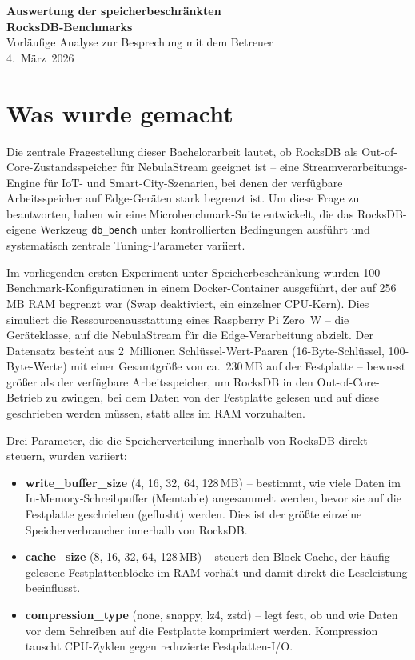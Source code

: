 \documentclass[11pt,a4paper]{scrartcl}
\begin{document}
\begin{center}
  {\LARGE\bfseries Auswertung der speicherbeschränkten\\RocksDB-Benchmarks}\\[6pt]
  {\large Vorläufige Analyse zur Besprechung mit dem Betreuer}\\[4pt]
  {\normalsize 4.~März~2026}
\end{center}

\bigskip

\section{Was wurde gemacht}

Die zentrale Fragestellung dieser Bachelorarbeit lautet, ob RocksDB als
Out-of-Core-Zustandsspeicher für NebulaStream geeignet ist -- eine
Streamverarbeitungs-Engine für IoT- und Smart-City-Szenarien, bei denen der
verfügbare Arbeitsspeicher auf Edge-Geräten stark begrenzt ist. Um diese Frage
zu beantworten, haben wir eine Microbenchmark-Suite entwickelt, die das
RocksDB-eigene Werkzeug \texttt{db\_bench} unter kontrollierten Bedingungen
ausführt und systematisch zentrale Tuning-Parameter variiert.

Im vorliegenden ersten Experiment unter Speicherbeschränkung wurden 100
Benchmark-Konfigurationen in einem Docker-Container ausgeführt, der auf
256\,MB RAM begrenzt war (Swap deaktiviert, ein einzelner CPU-Kern). Dies
simuliert die Ressourcenausstattung eines Raspberry Pi Zero~W -- die
Geräteklasse, auf die NebulaStream für die Edge-Verarbeitung abzielt. Der
Datensatz besteht aus 2~Millionen Schlüssel-Wert-Paaren (16-Byte-Schlüssel,
100-Byte-Werte) mit einer Gesamtgröße von ca.\ 230\,MB auf der Festplatte
-- bewusst größer als der verfügbare Arbeitsspeicher, um RocksDB in den
Out-of-Core-Betrieb zu zwingen, bei dem Daten von der Festplatte gelesen und
auf diese geschrieben werden müssen, statt alles im RAM vorzuhalten.

Drei Parameter, die die Speicherverteilung innerhalb von RocksDB direkt
steuern, wurden variiert:

\begin{itemize}
  \item \textbf{write\_buffer\_size} (4, 16, 32, 64, 128\,MB) -- bestimmt, wie
        viele Daten im In-Memory-Schreibpuffer (Memtable) angesammelt werden,
        bevor sie auf die Festplatte geschrieben (geflusht) werden. Dies ist der
        größte einzelne Speicherverbraucher innerhalb von RocksDB.
  \item \textbf{cache\_size} (8, 16, 32, 64, 128\,MB) -- steuert den
        Block-Cache, der häufig gelesene Festplattenblöcke im RAM vorhält und
        damit direkt die Leseleistung beeinflusst.
  \item \textbf{compression\_type} (none, snappy, lz4, zstd) -- legt fest, ob
        und wie Daten vor dem Schreiben auf die Festplatte komprimiert werden.
        Kompression tauscht CPU-Zyklen gegen reduzierte Festplatten-I/O.
\end{itemize}
\end{document}
